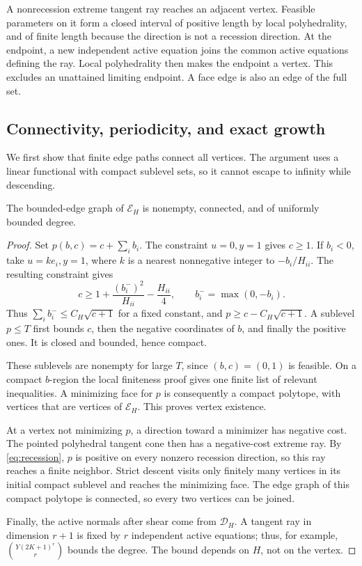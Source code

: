 A nonrecession extreme tangent ray reaches an adjacent vertex. Feasible parameters on it form a closed interval of positive length by local polyhedrality, and of finite length because the direction is not a recession direction. At the endpoint, a new independent active equation joins the common active equations defining the ray. Local polyhedrality then makes the endpoint a vertex. This excludes an unattained limiting endpoint. A face edge is also an edge of the full set.

\subsection{Connectivity, periodicity, and exact growth}
We first show that finite edge paths connect all vertices. The argument uses a linear functional with compact sublevel sets, so it cannot escape to infinity while descending.

\begin{lemma}\label{lem:connected}
The bounded-edge graph of $\mathcal E_H$ is nonempty, connected, and of uniformly bounded degree.
\end{lemma}
\begin{proof}
Set $p(b,c)=c+\sum_i b_i$. The constraint $u=0,y=1$ gives $c\ge1$. If $b_i<0$, take $u=ke_i,y=1$, where $k$ is a nearest nonnegative integer to $-b_i/H_{ii}$. The resulting constraint gives
\[
 c\ge1+\frac{(b_i^-)^2}{H_{ii}}-\frac{H_{ii}}4,
 \qquad b_i^-=\max(0,-b_i).
\]
Thus $\sum_i b_i^-\le C_H\sqrt{c+1}$ for a fixed constant, and $p\ge c-C_H\sqrt{c+1}$. A sublevel $p\le T$ first bounds $c$, then the negative coordinates of $b$, and finally the positive ones. It is closed and bounded, hence compact.

These sublevels are nonempty for large $T$, since $(b,c)=(0,1)$ is feasible. On a compact $b$-region the local finiteness proof gives one finite list of relevant inequalities. A minimizing face for $p$ is consequently a compact polytope, with vertices that are vertices of $\mathcal E_H$. This proves vertex existence.

At a vertex not minimizing $p$, a direction toward a minimizer has negative cost. The pointed polyhedral tangent cone then has a negative-cost extreme ray. By \eqref{eq:recession}, $p$ is positive on every nonzero recession direction, so this ray reaches a finite neighbor. Strict descent visits only finitely many vertices in its initial compact sublevel and reaches the minimizing face. The edge graph of this compact polytope is connected, so every two vertices can be joined.

Finally, the active normals after shear come from $\mathcal D_H$. A tangent ray in dimension $r+1$ is fixed by $r$ independent active equations; thus, for example, $\binom{Y(2K+1)^r}{r}$ bounds the degree. The bound depends on $H$, not on the vertex.
\end{proof}

